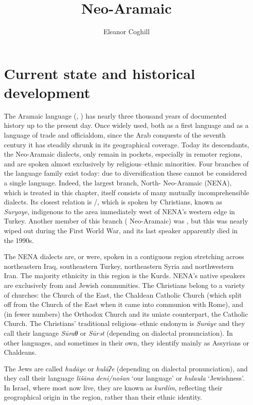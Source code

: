 \documentclass[output=paper]{langsci/langscibook}
\author{Eleanor Coghill\affiliation{Uppsala University}}
\title{Neo-Aramaic}
\begin{document}
\section{Current state and historical development}

The Aramaic language (, ) has nearly three thousand years of documented history up to the present day. Once widely used, both as a first language and as a language of trade and officialdom, since the Arab conquests of the seventh century it has steadily shrunk in its geographical coverage. Today its descendants, the Neo-Aramaic dialects, only remain in pockets, especially in remoter regions, and are spoken almost exclusively by religious–ethnic minorities. Four branches of the language family exist today: due to diversification these cannot be considered a single language. Indeed, the largest branch, North- Neo-Aramaic (NENA), which is treated in this chapter, itself consists of many mutually incomprehensible dialects. Its closest relation is /, which is spoken by {Christians}, known as \textit{Suryoye}, indigenous to the area immediately west of NENA’s western edge in Turkey. Another member of this branch ( Neo-Aramaic) was , but this was nearly wiped out during the First World War, and its last speaker apparently died in the 1990s. 

The NENA dialects are, or were, spoken in a contiguous region stretching across northeastern Iraq, southeastern Turkey, northeastern Syria and northwestern Iran. The majority ethnicity in this region is the {Kurds}. NENA’s native speakers are exclusively from  and Jewish communities. The {Christians} belong to a variety of churches: the Church of the East, the Chaldean Catholic Church (which split off from the Church of the East when it came into communion with Rome), and (in fewer numbers) the  Orthodox Church and its uniate counterpart, the  Catholic Church. The {Christians}’ traditional religious–ethnic endonym is \textit{Surāye} and they call their language \textit{Sūraθ} or \textit{Sūrət} (depending on dialectal pronunciation). In other languages, and sometimes in their own, they identify mainly as Assyrians or Chaldeans.

The {Jews} are called \textit{hudāye} or \textit{hulāʔe} (depending on dialectal pronunciation), and they call their language \textit{lišāna} \textit{deni/nošan} ‘our language’ or \textit{hulaula} ‘Jewishness’. In Israel, where most now live, they are known as \textit{kurdím}, reflecting their geographical origin in the  region, rather than their ethnic {identity}.
\end{document}

